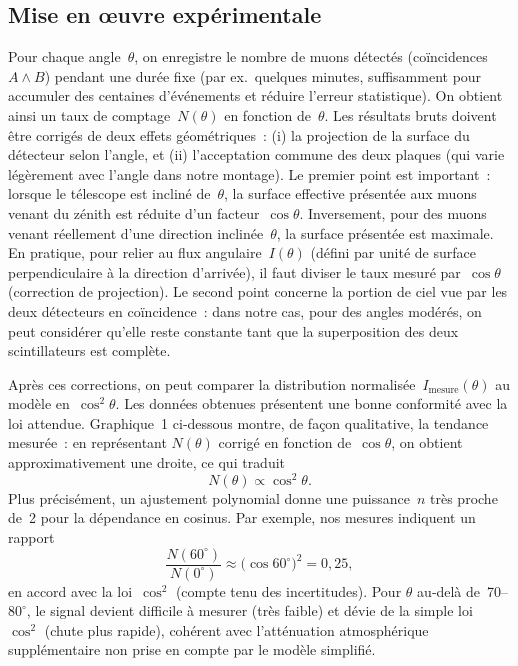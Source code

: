\documentclass[a4paper,12pt,twoside]{article}
\begin{document}
\subsection{Mise en œuvre expérimentale}
Pour chaque angle~$\theta$, on enregistre le nombre de muons détectés (coïncidences $A\wedge B$) pendant une durée fixe (par ex.\ quelques minutes, suffisamment pour accumuler des centaines d’événements et réduire l’erreur statistique). On obtient ainsi un taux de comptage~$N(\theta)$ en fonction de~$\theta$. Les résultats bruts doivent être corrigés de deux effets géométriques~: (i) la projection de la surface du détecteur selon l'angle, et (ii) l'acceptation commune des deux plaques (qui varie légèrement avec l'angle dans notre montage). Le premier point est important~: lorsque le télescope est incliné de~$\theta$, la surface effective présentée aux muons venant du zénith est réduite d'un facteur~$\cos\theta$. Inversement, pour des muons venant réellement d'une direction inclinée~$\theta$, la surface présentée est maximale. En pratique, pour relier au flux angulaire~$I(\theta)$ (défini par unité de surface perpendiculaire à la direction d'arrivée), il faut diviser le taux mesuré par~$\cos\theta$ (correction de projection). Le second point concerne la portion de ciel vue par les deux détecteurs en coïncidence~: dans notre cas, pour des angles modérés, on peut considérer qu'elle reste constante tant que la superposition des deux scintillateurs est complète.

Après ces corrections, on peut comparer la distribution normalisée~$I_{\mathrm{mesure}}(\theta)$ au modèle en~$\cos^{2}\theta$. Les données obtenues présentent une bonne conformité avec la loi attendue. Graphique~1 ci‑dessous montre, de façon qualitative, la tendance mesurée~: en représentant $N(\theta)$ corrigé en fonction de~$\cos\theta$, on obtient approximativement une droite, ce qui traduit
\[
N(\theta)\propto\cos^{2}\theta.
\]
Plus précisément, un ajustement polynomial donne une puissance~$n$ très proche de~2 pour la dépendance en cosinus. Par exemple, nos mesures indiquent un rapport
\[
\frac{N(60^\circ)}{N(0^\circ)} \approx \bigl(\cos 60^\circ\bigr)^2 = 0{,}25,
\]
en accord avec la loi~$\cos^2$ (compte tenu des incertitudes). Pour $\theta$ au‑delà de~70--$80^\circ$, le signal devient difficile à mesurer (très faible) et dévie de la simple loi~$\cos^2$ (chute plus rapide), cohérent avec l'atténuation atmosphérique supplémentaire non prise en compte par le modèle simplifié.
\end{document}
